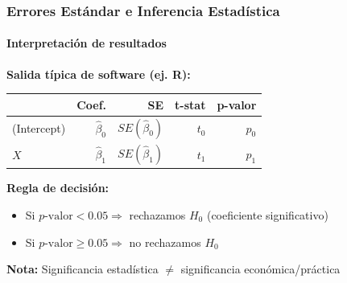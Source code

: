\documentclass[aspectratio=169,11pt]{beamer}
\begin{document}
\begin{frame}
\frametitle{Errores Estándar e Inferencia Estadística}
\framesubtitle{Interpretación de resultados}

\small
\textbf{Salida típica de software (ej. R):}

\begin{table}
    \centering
    \footnotesize
    \begin{tabular}{lrrrr}
        \toprule
        & Coef. & SE & t-stat & p-valor \\
        \midrule
        (Intercept) & $\hat{\beta}_0$ & $SE(\hat{\beta}_0)$ & $t_0$ & $p_0$ \\
        $X$ & $\hat{\beta}_1$ & $SE(\hat{\beta}_1)$ & $t_1$ & $p_1$ \\
        \bottomrule
    \end{tabular}
\end{table}

\vspace{0.4cm}
\textbf{Regla de decisión:}
\begin{itemize}
    \item Si $p\text{-valor} < 0.05 \Rightarrow$ rechazamos $H_0$ (coeficiente significativo)
    \item Si $p\text{-valor} \geq 0.05 \Rightarrow$ no rechazamos $H_0$
\end{itemize}

\vspace{0.3cm}
\textbf{Nota:} Significancia estadística $\neq$ significancia económica/práctica
\end{frame}
\end{document}
